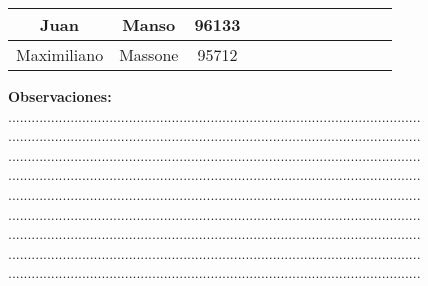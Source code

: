 \begin{titlepage}
\begin{center}
\begin{tabular}{|c|c|c|c|c|c|c|c|c|c|c|c|}
\hline
Juan & Manso  & 96133& \hspace{4mm} & \hspace{4mm} & \hspace{4mm} & \hspace{4mm} &\hspace{4mm} &\hspace{4mm} &\hspace{4mm} &\hspace{4mm} &\hspace{4mm} \\
\hline
Maximiliano & Massone  & 95712& \hspace{4mm} & \hspace{4mm} & \hspace{4mm} & \hspace{4mm} &\hspace{4mm} &\hspace{4mm} &\hspace{4mm} &\hspace{4mm} &\hspace{4mm} \\
\hline
\end{tabular}

\vspace{9mm}
{\bf Observaciones: \hfill}\\
..........................................................................................................\\
..........................................................................................................\\
..........................................................................................................\\
..........................................................................................................\\
..........................................................................................................\\
..........................................................................................................\\
..........................................................................................................\\
..........................................................................................................\\
..........................................................................................................\\


\end{center}
\end{titlepage}
